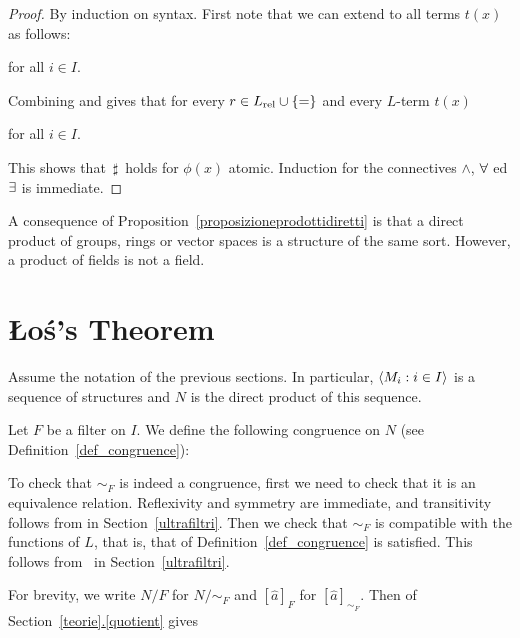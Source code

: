 \documentclass[creche.tex]{subfiles}
\begin{document}
\begin{proof}
By induction on syntax. First note that we can extend  to all terms $t(x)$ as follows:

\hfill  for all $i\in I$. 

Combining  and  gives that for every $r\in L_{\rm rel}\cup\{=\}$ and every $L$-term $t(x)$

\hfill  for all $i\in I$.

This shows that $\,\sharp\,$ holds for $\phi(x)$ atomic. Induction for the connectives $\wedge$, $\forall$ ed $\exists$ is immediate.
\end{proof}

A consequence of Proposition~\ref{proposizioneprodottidiretti} is that a direct product of groups, rings or vector spaces is a structure of the same sort. However, a product of fields is not a field.

\section{\L o\'{s}'s Theorem}
Assume the notation of the previous sections. In particular, $\langle M_i:i\in I\rangle$ is a sequence of structures and $N$ is the direct product of this sequence. 

Let $F$ be a filter on $I$. We define the following congruence on $N$ (see Definition~\ref{def_congruence}):


To check that $\sim_F$ is indeed a congruence, first we need to check that it is an equivalence relation. Reflexivity and symmetry are immediate, and transitivity follows from  in Section~\ref{ultrafiltri}. Then we check that $\sim_F$ is compatible with the functions of $L$, that is, that  of Definition~\ref{def_congruence} is satisfied. This follows from~ in Section~\ref{ultrafiltri}. 

For brevity, we write $N/F$ for $N/{\sim}_F$ and $[\hat a]_F$ for $[\hat a]_{\sim_F}$. Then  of Section~\hyperref[quotient]{\ref*{teorie}.\ref*{quotient}} gives
\end{document}
